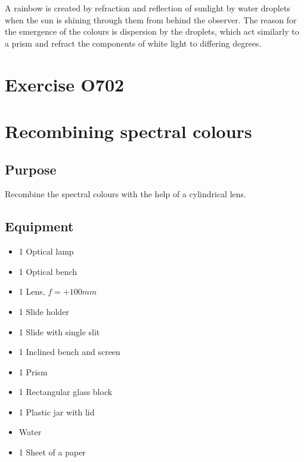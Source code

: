 \documentclass[12pt]{article}
\begin{document}
A rainbow is created by refraction and reflection of sunlight by water droplets when the sun is
shining through them from behind the observer. The reason for the emergence of the colours is
dispersion by the droplets, which act similarly to a prism and refract the components of white
light to differing degrees.

\newpage
\section*{Exercise O702}

\section*{Recombining spectral colours}

\subsection*{Purpose}
Recombine the spectral colours with the help of a cylindrical lens.

\subsection*{Equipment}
\begin{itemize}
    \item 1 Optical lamp
    \item 1 Optical bench
    \item 1 Lens, $f=+100 mm$
    \item 1 Slide holder
    \item 1 Slide with single slit
    \item 1 Inclined bench and screen
    \item 1 Prism
    \item 1 Rectangular glass block
    \item 1 Plastic jar with lid
    \item Water
    \item 1 Sheet of a paper
\end{itemize}
\end{document}
